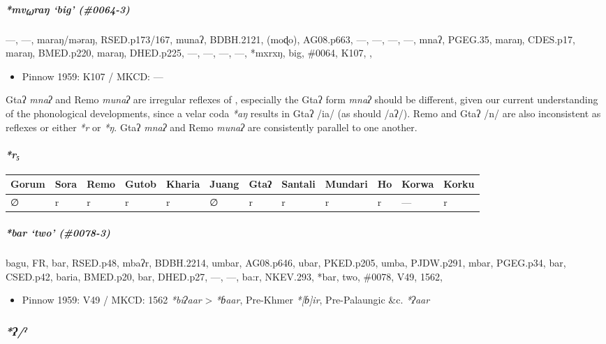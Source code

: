 \documentclass[a4paper,]{article}
\providecommand{\tightlist}{%
  \setlength{\itemsep}{0pt}\setlength{\parskip}{0pt}}
\let\oldparagraph\paragraph
\renewcommand{\paragraph}[1]{\oldparagraph{#1}\mbox{}}
\let\oldsubparagraph\subparagraph
\renewcommand{\subparagraph}[1]{\oldsubparagraph{#1}\mbox{}}
\begin{document}
\subparagraph{\texorpdfstring{\emph{*mv₍₄₎raŋ} `big'
(\#0064-3)}{*mv₍₄₎raŋ big (\#0064-3)}}\label{mvraux14b-big-0064-3}

---, ---, maraŋ/məraŋ, RSED.p173/167, munaʔ, BDBH.2121, (moɖo),
AG08.p663, ---, ---, ---, ---, mnaʔ, PGEG.35, maraŋ, CDES.p17, maraŋ,
BMED.p220, maraŋ, DHED.p225, ---, ---, ---, ---, *mxrxŋ, big, \#0064,
K107, ,

\begin{itemize}
\tightlist
\item
  Pinnow 1959: K107 / MKCD: ---
\end{itemize}

Gtaʔ \emph{mnaʔ} and Remo \emph{munaʔ} are irregular reflexes of ,
especially the Gtaʔ form \emph{mnaʔ} should be different, given our
current understanding of the phonological developments, since a velar
coda \emph{*aŋ} results in Gtaʔ /ia/ (as should /aʔ/). Remo and Gtaʔ /n/
are also inconsistent as reflexes or either \emph{*r} or \emph{*ŋ}. Gtaʔ
\emph{mnaʔ} and Remo \emph{munaʔ} are consistently parallel to one
another.

\paragraph{\texorpdfstring{\emph{*r₅}}{*r₅}}\label{r-4}

\begin{longtable}[]{@{}llllllllllll@{}}
\toprule
Gorum & Sora & Remo & Gutob & Kharia & Juang & Gtaʔ & Santali & Mundari
& Ho & Korwa & Korku\tabularnewline
\midrule
\endhead
∅ & r & r & r & r & ∅ & r & r & r & r & --- & r\tabularnewline
\bottomrule
\end{longtable}

\subparagraph{\texorpdfstring{\emph{*bar} `two'
(\#0078-3)}{*bar two (\#0078-3)}}\label{bar-two-0078-3}

bagu, FR, bar, RSED.p48, mbaʔr, BDBH.2214, umbar, AG08.p646, ubar,
PKED.p205, umba, PJDW.p291, mbar, PGEG.p34, bar, CSED.p42, baria,
BMED.p20, bar, DHED.p27, ---, ---, ba:r, NKEV.293, *bar, two, \#0078,
V49, 1562,

\begin{itemize}
\tightlist
\item
  Pinnow 1959: V49 / MKCD: 1562 \emph{*biʔaar} \textgreater{}
  \emph{*ɓaar}, Pre-Khmer \emph{*{[}ɓ{]}ir}, Pre-Palaungic \&c.
  \emph{*ʔaar}
\end{itemize}

\subsubsection{\texorpdfstring{\emph{*ʔ/ˀ}}{*ʔ/ˀ}}\label{ux294ux2c0}
\end{document}

